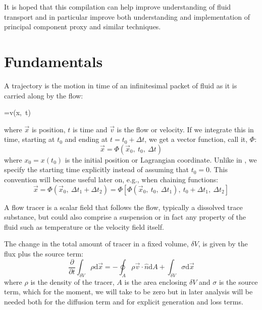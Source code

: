 It is hoped that this compilation
can help improve understanding of fluid transport and in particular 
improve both understanding and implementation of principal component
proxy and similar techniques.

\section{Fundamentals}

A trajectory is the motion in time of an infinitesimal packet of fluid
as it is carried along by the flow:
\begin{eqnl}
	=\vec v(\vec x,~t) \label{trajectory_equation}
\end{eqnl}
where $\vec x$ is position, $t$ is time and $\vec v$ is the flow or velocity.
If we integrate this in time, starting at $t_0$ and ending at $t=t_0+\Delta t$, we get a
vector function, call it, $\Phi$:
\begin{equation}
	\vec x=\Phi(\vec x_0,~t_0,~\Delta t)
\label{traj_def}
\end{equation}
where $x_0=x(t_0)$ is the initial position or Lagrangian coordinate.
Unlike in \citet{Ottino1989}, we specify the starting time explicitly instead 
of assuming that $t_0=0$.  This convention will become useful later on, e.g., 
when chaining functions:
\begin{equation}
\vec x=\Phi(\vec x_0,~\Delta t_1+\Delta t_2)=\Phi[\Phi(\vec x_0,~t_0,~\Delta t_1),~t_0 + \Delta t_1,~\Delta t_2]
\label{traj_fun_chaining}
\end{equation}

A flow tracer is a scalar field that follows the flow, typically a dissolved
trace substance, but could also comprise a suspension or in fact any property
of the fluid such as temperature or the velocity field itself.

The change in the total amount of tracer in a fixed volume, $\delta V$, is given
by the flux plus the source term:
\begin{equation}
	\frac{\partial}{\partial t}\int_{\delta V} \rho \mathrm d \vec x=-\oint_A \rho \vec v \cdot \hat n \mathrm d A
	+ \int_{\delta V} \sigma \mathrm d \vec x
	\label{volume_conservation_integral}
\end{equation}
where $\rho$ is the density of the tracer,
$A$ is the area enclosing $\delta V$ and $\sigma$ is the source term, which for the moment,
we will take to be zero but in later analysis will 
be needed both for the diffusion term and for explicit generation and loss terms.

